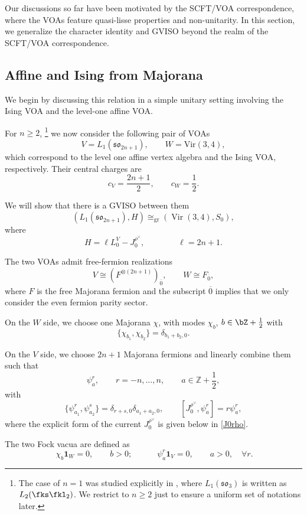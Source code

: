 \documentclass[a4paper,11pt]{article}
\theoremstyle{definition}
\theoremstyle{definition}
\theoremstyle{remark}
\newcommand{\be}{\begin{equation}}
\newcommand{\ee}{\end{equation}}
\begin{document}
Our discussions so far have been motivated by the SCFT/VOA correspondence, where the VOAs feature quasi-lisse properties and non-unitarity. In this section, we generalize the character identity and GVISO beyond the realm of the SCFT/VOA correspondence. 
 
 \subsection{Affine and Ising    from Majorana  }

  We begin by discussing this relation in a simple unitary setting involving the Ising VOA and the level-one affine VOA.


  For $n\ge2$,  \footnote{The case of $n=1$  
was studied explicitly  in  \cite{Adamovic:2025efe}, where $L_1(\mathfrak{so}_{3})$ is written as $L_2(\fks\fkl_2)$. We restrict to $n\ge 2$ just to ensure a  uniform set of  notations later.} we now consider the following pair of VOAs 
 \be
 V=L_1(\mathfrak{so}_{2n+1}),\qquad W=\text{Vir}(3,4),
 \ee
 which correspond  to the level one affine vertex algebra  and the Ising VOA, respectively.  Their central charges are
 \be
 c_V=\frac{2n+1}{2}, \qquad c_W=\frac12.
 \ee
 
 We will show that there is a GVISO between them 
  \be\label{IsingSO}
 \left(L_1(\mathfrak{so}_{2n+1}),
H\right)
\cong_{\mathrm{gr}}
\left(\operatorname{Vir}(3,4),S_0\right),
\ee
where
\be\label{Hising}
H=\ell L_0^V-J_0^{\rho^\vee},\qquad\qquad  \ell=2n+1.
\ee

 
The two VOAs admit  free-fermion realizations  
\be\label{VWF}
V\cong(F^{\otimes(2n+1)})_{\overline0},
\qquad
W\cong F_{\overline0},
\ee
where $ F$ is the free Majorana fermion and the subscript  ${\overline0}$ implies that we only consider the even fermion parity sector. 

On the $W$ side, we choose one Majorana  $\chi$, with modes $\chi_b$, $b \in \bZ+\frac12$ with 
\be
\{\chi_{b_1},\chi_{b_2}\}
= \delta_{b_1+b_2,0}.
\ee


On the $V$ side, we choose $2n+1$ Majorana  fermions and linearly combine them such that
\be\label{psimode}
\psi^r_a,\qquad
r=-n,\ldots,n,\qquad a\in\mathbb Z+\frac12,
\ee
with
\be
\{\psi^r_{a_1},\psi^s_{a_2}\}
=\delta_{r+s,0}\delta_{a_1+a_2,0},
\qquad
[J_0^{\rho^\vee},\psi^r_a]=r\psi^r_a,
\label{J0rho-charge}
\ee
where the explicit form of the current $J_0^{\rho^\vee}$ is given below in \eqref{J0rho}. 

 
 The two Fock vacua are defined as 
 \be\label{Fpsichi}
 \ \chi_b\bm 1_W=0, \qquad b>0;
 \qquad\quad    \psi_ a^r\bm 1_V=0, \qquad a>0, \quad\forall r .
 \ee
 
\end{document}
